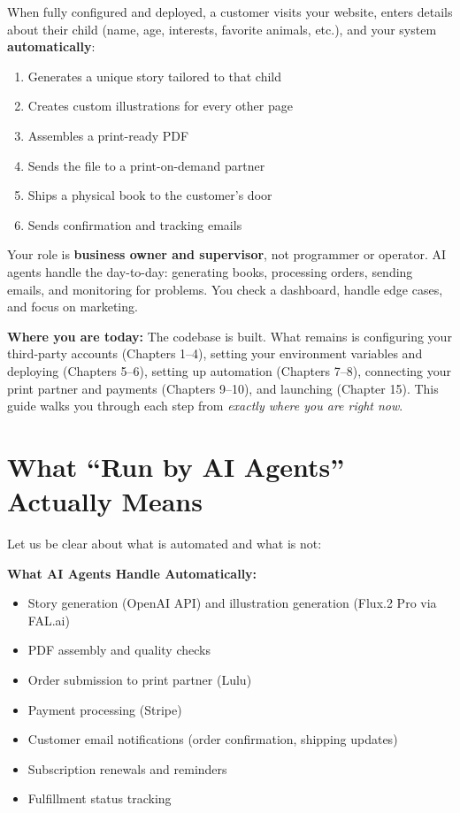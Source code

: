 \documentclass[12pt, letterpaper, oneside]{book}
\begin{document}
\noindent When fully configured and deployed, a customer visits your website, enters details about their child (name, age, interests, favorite animals, etc.), and your system \textbf{automatically}:

\begin{enumerate}[leftmargin=2em]
  \item Generates a unique story tailored to that child
  \item Creates custom illustrations for every other page
  \item Assembles a print-ready PDF
  \item Sends the file to a print-on-demand partner
  \item Ships a physical book to the customer's door
  \item Sends confirmation and tracking emails
\end{enumerate}

\noindent Your role is \textbf{business owner and supervisor}, not programmer or operator. AI agents handle the day-to-day: generating books, processing orders, sending emails, and monitoring for problems. You check a dashboard, handle edge cases, and focus on marketing.

\begin{successbox}
\textbf{Where you are today:} The codebase is built. What remains is configuring your third-party accounts (Chapters 1--4), setting your environment variables and deploying (Chapters 5--6), setting up automation (Chapters 7--8), connecting your print partner and payments (Chapters 9--10), and launching (Chapter 15). This guide walks you through each step from \textit{exactly where you are right now}.
\end{successbox}

\section*{What ``Run by AI Agents'' Actually Means}

Let us be clear about what is automated and what is not:

\begin{successbox}
\textbf{What AI Agents Handle Automatically:}
\begin{itemize}[leftmargin=1.5em, itemsep=2pt]
  \item Story generation (OpenAI API) and illustration generation (Flux.2 Pro via FAL.ai)
  \item PDF assembly and quality checks
  \item Order submission to print partner (Lulu)
  \item Payment processing (Stripe)
  \item Customer email notifications (order confirmation, shipping updates)
  \item Subscription renewals and reminders
  \item Fulfillment status tracking
\end{itemize}
\end{successbox}
\end{document}

